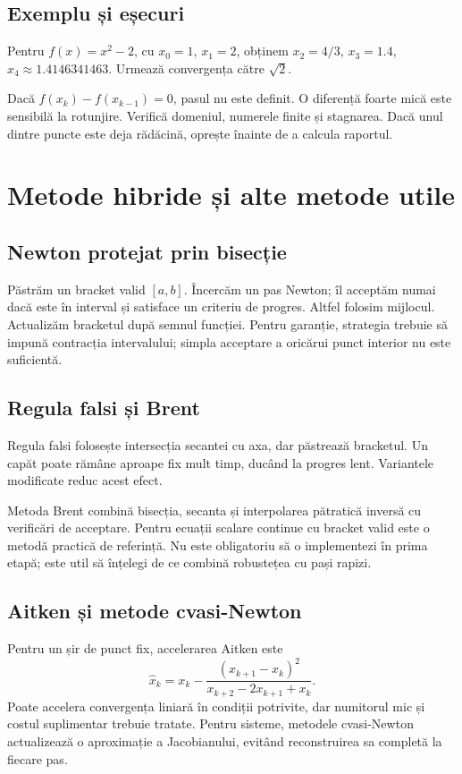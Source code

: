 \documentclass[11pt,a4paper]{article}
\begin{document}
\subsection{Exemplu și eșecuri}
Pentru $f(x)=x^2-2$, cu $x_0=1$, $x_1=2$, obținem $x_2=4/3$, $x_3=1.4$, $x_4\approx1.4146341463$. Urmează convergența către $\sqrt2$.

Dacă $f(x_k)-f(x_{k-1})=0$, pasul nu este definit. O diferență foarte mică este sensibilă la rotunjire. Verifică domeniul, numerele finite și stagnarea. Dacă unul dintre puncte este deja rădăcină, oprește înainte de a calcula raportul.

\section{Metode hibride și alte metode utile}
\subsection{Newton protejat prin bisecție}
Păstrăm un bracket valid $[a,b]$. Încercăm un pas Newton; îl acceptăm numai dacă este în interval și satisface un criteriu de progres. Altfel folosim mijlocul. Actualizăm bracketul după semnul funcției. Pentru garanție, strategia trebuie să impună contracția intervalului; simpla acceptare a oricărui punct interior nu este suficientă.

\subsection{Regula falsi și Brent}
Regula falsi folosește intersecția secantei cu axa, dar păstrează bracketul. Un capăt poate rămâne aproape fix mult timp, ducând la progres lent. Variantele modificate reduc acest efect.

Metoda Brent combină bisecția, secanta și interpolarea pătratică inversă cu verificări de acceptare. Pentru ecuații scalare continue cu bracket valid este o metodă practică de referință. Nu este obligatoriu să o implementezi în prima etapă; este util să înțelegi de ce combină robustețea cu pași rapizi.

\subsection{Aitken și metode cvasi-Newton}
Pentru un șir de punct fix, accelerarea Aitken este
\[
\widehat x_k=x_k-\frac{(x_{k+1}-x_k)^2}{x_{k+2}-2x_{k+1}+x_k}.
\]
Poate accelera convergența liniară în condiții potrivite, dar numitorul mic și costul suplimentar trebuie tratate. Pentru sisteme, metodele cvasi-Newton actualizează o aproximație a Jacobianului, evitând reconstruirea sa completă la fiecare pas.
\end{document}
